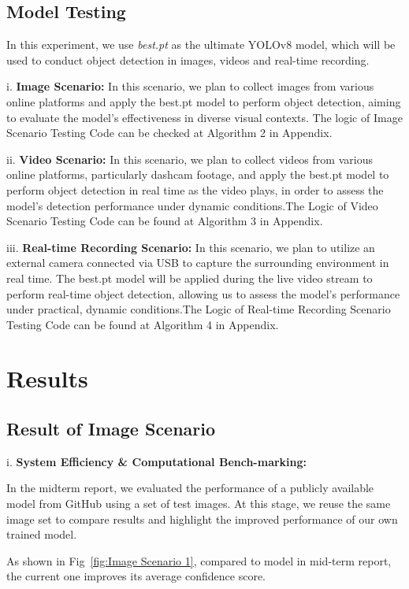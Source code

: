 \documentclass[journal,transmag]{IEEEtran}
\begin{document}
\subsection{Model Testing}
In this experiment, we use \textit{best.pt} as the ultimate YOLOv8 model, which will be used to conduct object detection in images, videos and real-time recording. 

i. \textbf{Image Scenario:} In this scenario, we plan to collect images from various online platforms and apply the best.pt model to perform object detection, aiming to evaluate the model’s effectiveness in diverse visual contexts. The logic of Image Scenario Testing Code can be checked at Algorithm 2 in Appendix.


ii. \textbf{Video Scenario:} In this scenario, we plan to collect videos from various online platforms, particularly dashcam footage, and apply the best.pt model to perform object detection in real time as the video plays, in order to assess the model’s detection performance under dynamic conditions.The Logic of Video Scenario Testing Code can be found at Algorithm 3 in Appendix.


iii. \textbf{Real-time Recording Scenario:} In this scenario, we plan to utilize an external camera connected via USB to capture the surrounding environment in real time. The best.pt model will be applied during the live video stream to perform real-time object detection, allowing us to assess the model’s performance under practical, dynamic conditions.The Logic of Real-time Recording Scenario Testing Code can be found at Algorithm 4 in Appendix.


\section{Results}


\subsection{Result of Image Scenario}

i. \textbf{System Efficiency \& Computational Bench-marking:}

In the midterm report, we evaluated the performance of a publicly available model from GitHub using a set of test images. At this stage, we reuse the same image set to compare results and highlight the improved performance of our own trained model.

As shown in Fig~\ref{fig:Image Scenario 1}, compared to model in mid-term report, the current one improves its average confidence score. 
\end{document}
